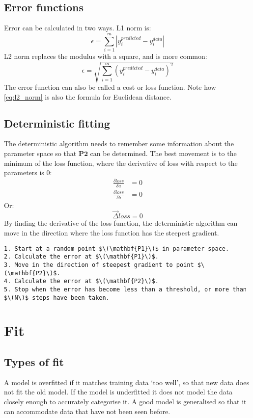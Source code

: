 \subsection{Error functions}
Error can be calculated in two ways. L1 norm is:
\begin{equation*}
    \epsilon = \sum_{i=1}^{m}|y_i^{predicted} - y_i^{data}|
\end{equation*}
L2 norm replaces the modulus with a square, and is more common:
\begin{equation}
    \epsilon = \sqrt{\sum_{i=1}^{m}(y_i^{predicted} - y_i^{data})^2}
    \label{eq:l2_norm}
\end{equation}
The error function can also be called a cost or loss function. Note how \cref{eq:l2_norm} is also the formula for Euclidean distance.

\subsection{Deterministic fitting}
The deterministic algorithm needs to remember some information about the parameter space so that \(\mathbf{P2}\) can be determined. The best movement is to the minimum of the loss function, where the derivative of loss with respect to the parameters is 0:
\begin{align*}
    \frac{\delta loss}{\delta a} & = 0 \\
    \frac{\delta loss}{\delta b} & = 0
\end{align*}
Or:
\begin{equation*}
    \vec{\Delta} loss = 0
\end{equation*}
By finding the derivative of the loss function, the deterministic algorithm can move in the direction where the loss function has the steepest gradient.

\begin{lstlisting}
1. Start at a random point $\(\mathbf{P1}\)$ in parameter space.
2. Calculate the error at $\(\mathbf{P1}\)$.
3. Move in the direction of steepest gradient to point $\(\mathbf{P2}\)$.
4. Calculate the error at $\(\mathbf{P2}\)$.
5. Stop when the error has become less than a threshold, or more than $\(N\)$ steps have been taken.
\end{lstlisting}

\section{Fit}
\subsection{Types of fit}
A model is overfitted if it matches training data `too well', so that new data does not fit the old model. If the model is underfitted it does not model the data closely enough to accurately categorise it. A good model is generalised so that it can accommodate data that have not been seen before.

